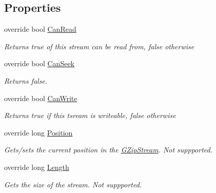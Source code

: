 \subsection*{Properties}
\begin{DoxyCompactItemize}
\item 
override bool \hyperlink{class_dot_z_lib_1_1_g_zip_stream_a627994338e73782d92b51422a1e36fcc}{Can\+Read}
\begin{DoxyCompactList}\small\item\em Returns true of this stream can be read from, false otherwise \end{DoxyCompactList}\item 
override bool \hyperlink{class_dot_z_lib_1_1_g_zip_stream_a0444494c95dda0c7218b760af229850a}{Can\+Seek}
\begin{DoxyCompactList}\small\item\em Returns false. \end{DoxyCompactList}\item 
override bool \hyperlink{class_dot_z_lib_1_1_g_zip_stream_a19296c736675fdc4210a9126431c7bf1}{Can\+Write}
\begin{DoxyCompactList}\small\item\em Returns true if this tsream is writeable, false otherwise \end{DoxyCompactList}\item 
override long \hyperlink{class_dot_z_lib_1_1_g_zip_stream_a408186c8247fd657799518aac256d6d7}{Position}
\begin{DoxyCompactList}\small\item\em Gets/sets the current position in the {\ttfamily \hyperlink{class_dot_z_lib_1_1_g_zip_stream}{G\+Zip\+Stream}}. Not suppported. \end{DoxyCompactList}\item 
override long \hyperlink{class_dot_z_lib_1_1_g_zip_stream_ad63ba8f24f1661998780789390fef4ac}{Length}
\begin{DoxyCompactList}\small\item\em Gets the size of the stream. Not suppported. \end{DoxyCompactList}\end{DoxyCompactItemize}


